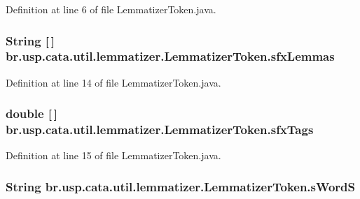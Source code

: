 Definition at line 6 of file Lemmatizer\+Token.\+java.

\hypertarget{classbr_1_1usp_1_1cata_1_1util_1_1lemmatizer_1_1_lemmatizer_token_afbd666214bf9fa5fbda010a1faab7631}{
\subsubsection[{sfx\+Lemmas}]{\setlength{\rightskip}{0pt plus 5cm}String \mbox{[}$\,$\mbox{]} br.\+usp.\+cata.\+util.\+lemmatizer.\+Lemmatizer\+Token.\+sfx\+Lemmas\hspace{0.3cm}{\ttfamily [private]}}}\label{classbr_1_1usp_1_1cata_1_1util_1_1lemmatizer_1_1_lemmatizer_token_afbd666214bf9fa5fbda010a1faab7631}


Definition at line 14 of file Lemmatizer\+Token.\+java.

\hypertarget{classbr_1_1usp_1_1cata_1_1util_1_1lemmatizer_1_1_lemmatizer_token_a97a851b9c56dd87615a8e126aee10c3d}{
\subsubsection[{sfx\+Tags}]{\setlength{\rightskip}{0pt plus 5cm}double \mbox{[}$\,$\mbox{]} br.\+usp.\+cata.\+util.\+lemmatizer.\+Lemmatizer\+Token.\+sfx\+Tags\hspace{0.3cm}{\ttfamily [private]}}}\label{classbr_1_1usp_1_1cata_1_1util_1_1lemmatizer_1_1_lemmatizer_token_a97a851b9c56dd87615a8e126aee10c3d}


Definition at line 15 of file Lemmatizer\+Token.\+java.

\hypertarget{classbr_1_1usp_1_1cata_1_1util_1_1lemmatizer_1_1_lemmatizer_token_a0d9042fce2eb10d74fcdf26f216ec040}{
\subsubsection[{s\+Word\+S}]{\setlength{\rightskip}{0pt plus 5cm}String br.\+usp.\+cata.\+util.\+lemmatizer.\+Lemmatizer\+Token.\+s\+Word\+S\hspace{0.3cm}{\ttfamily [private]}}}\label{classbr_1_1usp_1_1cata_1_1util_1_1lemmatizer_1_1_lemmatizer_token_a0d9042fce2eb10d74fcdf26f216ec040}


